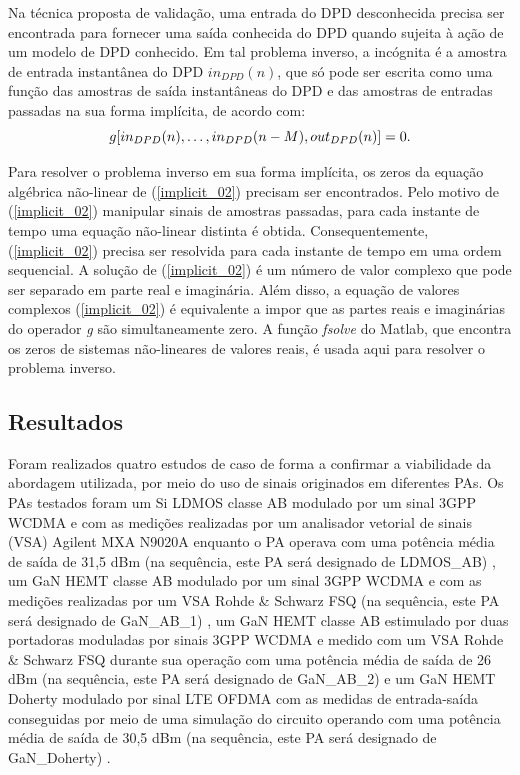Na técnica proposta de validação, uma entrada do DPD desconhecida precisa ser encontrada para fornecer uma saída conhecida do DPD quando sujeita à ação de um modelo de DPD conhecido. Em tal problema inverso, a incógnita é a amostra de entrada instantânea do DPD $in_{DPD}(n)$, que só pode ser escrita como uma função das amostras de saída instantâneas do DPD e das amostras de entradas passadas na sua forma implícita, de acordo com:
\begin{equation}
\small g[in_{DPD}(n),\ldots, in_{DPD}(n-M), out_{DPD}(n)]=0.
\label{implicit_02}
\end{equation}

Para resolver o problema inverso em sua forma implícita, os zeros da equação algébrica não-linear de (\ref{implicit_02}) precisam ser encontrados. Pelo motivo de (\ref{implicit_02}) manipular sinais de amostras passadas, para cada instante de tempo uma equação não-linear distinta é obtida. Consequentemente, (\ref{implicit_02}) precisa ser resolvida para cada instante de tempo em uma ordem sequencial. A solução de (\ref{implicit_02}) é um número de valor complexo que pode ser separado em parte real e imaginária. Além disso, a equação de valores complexos (\ref{implicit_02}) é equivalente a impor que as partes reais e imaginárias do operador \textit{g} são simultaneamente zero. A função \textit{fsolve} do Matlab, que encontra os zeros de sistemas não-lineares de valores reais, é usada aqui para resolver o problema inverso.

\subsection{Resultados}
Foram realizados quatro estudos de caso de forma a confirmar a viabilidade da abordagem utilizada, por meio do uso de sinais originados em diferentes {PAs}. Os PAs testados foram um Si LDMOS classe AB modulado por um sinal 3GPP WCDMA e com as medições realizadas por um analisador vetorial de sinais (VSA) Agilent MXA N9020A enquanto o PA operava com uma potência média de saída de 31,5 dBm (na sequência, este PA será designado de LDMOS{\_}AB) {\cite{franca_three-layer_2015}}, um GaN HEMT classe AB modulado por um sinal 3GPP WCDMA e com as medições realizadas por um VSA Rohde \& Schwarz FSQ (na sequência, este PA será designado de GaN{\_}AB{\_}1) {\cite{Bonfim2016}}, um GaN HEMT classe AB estimulado por duas portadoras moduladas por sinais 3GPP WCDMA e medido com um VSA Rohde \& Schwarz FSQ durante sua operação com uma potência média de saída de 26 dBm (na sequência, este PA será designado de GaN{\_}AB{\_}2) {\cite{franca_three-layer_2015}} e um GaN HEMT Doherty modulado por sinal LTE OFDMA com as medidas de entrada-saída conseguidas por meio de uma simulação do circuito operando com uma potência média de saída de 30,5 dBm (na sequência, este PA será designado de GaN{\_}Doherty) {\cite{franca_three-layer_2015}}.

